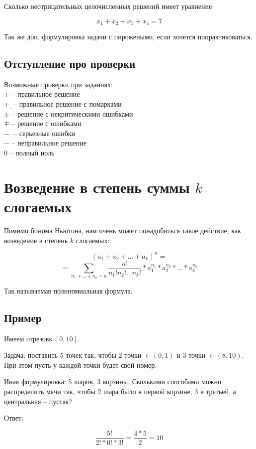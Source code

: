 \documentclass{article}
\begin{document}
Сколько неотрицательных целочисленных решений имеет уравнение:

$$x_1 + x_2 + x_3 + x_4 = 7$$

Так же доп. формулировка задачи с пирожеными, если хочется попрактиковаться.

\subsection{Отступление про проверки}

Возможные проверки при заданиях:\\
$+$ -- правильное решение\\
$+_{.}$ -- правильное решение с помарками\\
$\pm$ -- решение с некритическими ошибками\\
$\mp$ -- решение с ошибками\\
$-_{.}$ -- серьезные ошибки\\
$-$ -- неправильное решение\\
$0$ -- полный ноль\\

\section{Возведение в степень суммы $k$ слогаемых}

Помимо бинома Ньютона, нам очень может понадобиться такое действие, как возведение в степень $k$ слогаемых:

$$(a_1 + a_2 + ... + a_k) ^ n =$$
$$ = \sum_{n_1 + ... + n_k = n}{\frac{n!}{n_1!n_2!...n_k!} * a_1^{n_1}* a_2^{n_2} *... * a_k^{n_k}}$$

Так называемая полиномиальная формула.

\subsection{Пример}

Имеем отрезовк $[0, 10]$.

Задача: поставить $5$ точек так, чтобы 2 точки $\in (0, 1)$  и 3 точки $\in (8, 10)$.
При этом пусть у каждой точки будет свой номер.


Иная формулировка: 5 шаров, 3 корзины. Сколькими способами можно распределить мячи так, чтобы 2 шара было в первой корзине, 3 в третьей, а центральная -- пустая?

Ответ:

$$\frac{5!}{2! * 0! * 3!} = \frac{4 * 5}{2} = 10 $$
\end{document}
